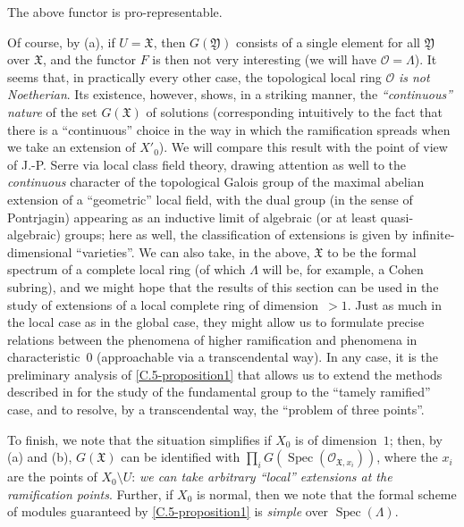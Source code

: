 \documentclass{article}
\theoremstyle{plain}
\newenvironment{proposition}[1]
  {\renewcommand\theinnercustomproposition{#1}\innercustomproposition}
  {\endinnercustomproposition}
\theoremstyle{definition}
\newcommand{\sh}[1]{{\mathscr{#1}}}
\newcommand{\fk}[1]{{\mathfrak{#1}}}
\DeclareMathOperator{\Spec}{Spec}
\begin{document}
\begin{proposition}{5.1}
\label{C.5-proposition1}
  The above functor is pro-representable.
\end{proposition}

Of course, by (a), if $U=\fk{X}$, then $G(\fk{Y})$ consists of a single element for all $\fk{Y}$ over $\fk{X}$, and the functor $F$ is then not very interesting (we will have $\sh{O}=\Lambda$).
It seems that, in practically every other case, the topological local ring $\sh{O}$ \emph{is not Noetherian}.
Its existence, however, shows, in a striking manner, the \emph{``continuous'' nature} of the set $G(\fk{X})$ of solutions (corresponding intuitively to the fact that there is a ``continuous'' choice in the way in which the ramification spreads when we take an extension of $X'_0$).
We will compare this result with the point of view of J.-P. Serre \cite{4} via local class field theory, drawing attention as well to the \emph{continuous} character of the topological Galois group of the maximal abelian extension of a ``geometric'' local field, with the dual group (in the sense of Pontrjagin) appearing as an inductive limit of algebraic (or at least quasi-algebraic) groups;
here as well, the classification of extensions is given by infinite-dimensional ``varieties''.
We can also take, in the above, $\fk{X}$ to be the formal spectrum of a complete local ring (of which $\Lambda$ will be, for example, a Cohen subring), and we might hope that the results of this section can be used in the study of extensions of a local complete ring of dimension~$>1$.
Just as much in the local case as in the global case, they might allow us to formulate precise relations between the phenomena of higher ramification and phenomena in characteristic~$0$ (approachable via a transcendental way).
In any case, it is the preliminary analysis of \cref{C.5-proposition1} that allows us to extend the methods described in \cite{2} for the study of the fundamental group to the ``tamely ramified'' case, and to resolve, by a transcendental way, the ``problem of three points''.

To finish, we note that the situation simplifies if $X_0$ is of dimension~$1$;
then, by (a) and (b), $G(\fk{X})$ can be identified with $\prod_i G(\Spec(\sh{O}_{\fk{X},x_i}))$, where the $x_i$ are the points of $X_0\setminus U$:
\emph{we can take arbitrary ``local'' extensions at the ramification points}.
Further, if $X_0$ is normal, then we note that the formal scheme of modules guaranteed by \cref{C.5-proposition1} is \emph{simple} over $\Spec(\Lambda)$.
\end{document}
